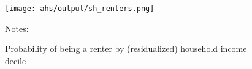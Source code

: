 \begin{figure}[h!]
    \centering
    \caption{Probability of being a renter by (residualized) household income decile}
    \label{fig:ahs_pr_renters}

	\texttt{[image: ahs/output/sh\_renters.png]}

    \begin{minipage}{.95\textwidth} \footnotesize
        \vspace{3mm}
        Notes:
    \end{minipage}
\end{figure}
